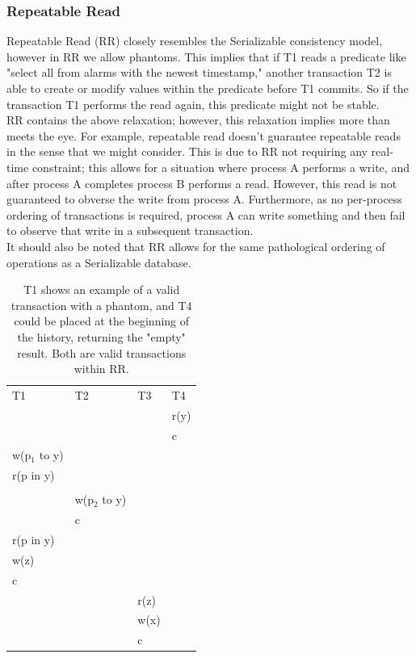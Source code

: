 \documentclass[a4paper,10pt,titlepage]{report}
\begin{document}
    \subsubsection{Repeatable Read}

    Repeatable Read (RR) closely resembles the Serializable consistency model, however in RR we allow phantoms. This implies that if T1 reads a predicate like "select all from alarms with the newest timestamp," another transaction T2 is able to create or modify values within the predicate before T1 commits. So if the transaction T1 performs the read again, this predicate might not be stable.
\\ \vspace{5mm}
    RR contains the above relaxation; however, this relaxation implies more than meets the eye. For example, repeatable read doesn't guarantee repeatable reads in the sense that we might consider. This is due to RR not requiring any real-time constraint; this allows for a situation where process A performs a write, and after process A completes process B performs a read. However, this read is not guaranteed to obverse the write from process A. Furthermore, as no per-process ordering of transactions is required, process A can write something and then fail to observe that write in a subsequent transaction.
\\ \vspace{5mm}
    It should also be noted that RR allows for the same pathological ordering of operations as a Serializable database.

    \begin{table}[h]
        \begin{tabular}{l|l|l|l}
            T1            & T2            & T3   & T4   \\
            &               &      & r(y) \\
            &               &      & c    \\
            w(p$_1$ to y) &               &      &      \\
            r(p in y)     &               &      &      \\
            &               &      &      \\
            & w(p$_2$ to y) &      &      \\
            & c             &      &      \\
            r(p in y)     &               &      &      \\
            w(z)          &               &      &      \\
            c             &               &      &      \\
            &               & r(z) &      \\
            &               & w(x) &      \\
            &               & c    &
        \end{tabular}
        \caption{T1 shows an example of a valid transaction with a phantom, and T4 could be placed at the beginning of the history, returning the "empty" result. Both are valid transactions within RR.}
    \end{table}
\end{document}

